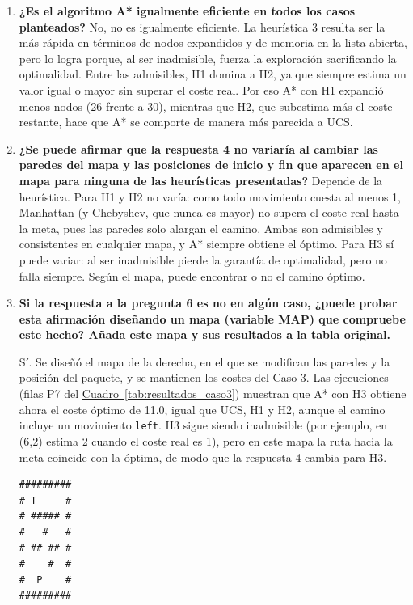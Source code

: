 \documentclass[12pt,a4paper]{article}
\begin{document}
\begin{enumerate}
    \item \textbf{¿Es el algoritmo A* igualmente eficiente en todos los casos planteados?} No, no es igualmente eficiente. La heurística 3 resulta ser la más rápida en términos de nodos expandidos y de memoria en la lista abierta, pero lo logra porque, al ser inadmisible, fuerza la exploración sacrificando la optimalidad. Entre las admisibles, H1 domina a H2, ya que siempre estima un valor igual o mayor sin superar el coste real. Por eso A* con H1 expandió menos nodos (26 frente a 30), mientras que H2, que subestima más el coste restante, hace que A* se comporte de manera más parecida a UCS.
    \item \textbf{¿Se puede afirmar que la respuesta 4 no variaría al cambiar las paredes del mapa y las posiciones de inicio y fin que aparecen en el mapa para ninguna de las heurísticas presentadas?} Depende de la heurística. Para H1 y H2 no varía: como todo movimiento cuesta al menos 1, Manhattan (y Chebyshev, que nunca es mayor) no supera el coste real hasta la meta, pues las paredes solo alargan el camino. Ambas son admisibles y consistentes en cualquier mapa, y A* siempre obtiene el óptimo. Para H3 sí puede variar: al ser inadmisible pierde la garantía de optimalidad, pero no falla siempre. Según el mapa, puede encontrar o no el camino óptimo.
    \item \textbf{Si la respuesta a la pregunta 6 es no en algún caso, ¿puede probar esta afirmación diseñando un mapa (variable MAP) que compruebe este hecho? Añada este mapa y sus resultados a la tabla original.}\\
\begin{minipage}[t]{0.74\linewidth}
Sí. Se diseñó el mapa de la derecha, en el que se modifican las paredes y la posición del paquete, y se mantienen los costes del Caso 3. Las ejecuciones (filas P7 del \hyperref[tab:resultados_caso3]{Cuadro~\ref*{tab:resultados_caso3}}) muestran que A* con H3 obtiene ahora el coste óptimo de 11.0, igual que UCS, H1 y H2, aunque el camino incluye un movimiento \texttt{left}. H3 sigue siendo inadmisible (por ejemplo, en (6,2) estima 2 cuando el coste real es 1), pero en este mapa la ruta hacia la meta coincide con la óptima, de modo que la respuesta 4 cambia para H3.
\end{minipage}\hfill
\begin{minipage}[t]{0.22\linewidth}\vspace{2pt}\singlespacing\footnotesize
\begin{verbatim}
#########
# T     #
# ##### #
#   #   #
# ## ## #
#    #  #
#  P    #
#########
\end{verbatim}
\end{minipage}
    \end{enumerate}
\end{document}
